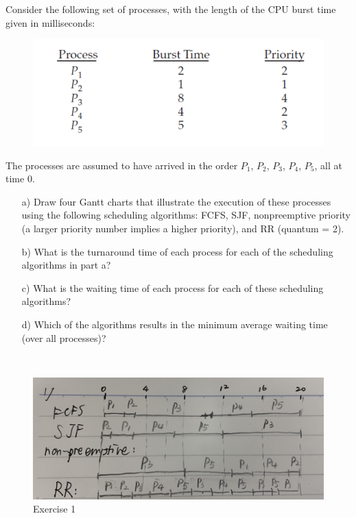 \begin{exercise}[]{
    Consider the following set of processes, with the length of the CPU burst time given in milliseconds:
    
    \begin{figure}[h]
        \begin{center}
            \includegraphics[scale=1]{a1.pdf}
        \end{center}
    \end{figure}

    The processes are assumed to have arrived in the order $P_1$, $P_2$, $P_3$, $P_4$, $P_5$, all at time 0.
    \begin{enumerate}
        \item [a)]
        Draw four Gantt charts that illustrate the execution of these processes using the following scheduling algorithms: FCFS, SJF, nonpreemptive priority (a larger priority number implies a higher priority), and RR (quantum = 2).
        
        \item [b)]
        What is the turnaround time of each process for each of the scheduling algorithms in part a?
        
        \item [c)]
        What is the waiting time of each process for each of these scheduling algorithms?
        
        \item [d)]
        Which of the algorithms results in the minimum average waiting time (over all processes)?
    \end{enumerate}
    }
  \begin{solution}
  \par{~}
  \begin{figure}
        \centering
        \includegraphics[width=12cm]{ex9-1.jpg}
        \caption{Exercise 1}
        \label{fig1}
    \end{figure}


\end{solution}
\end{exercise}

